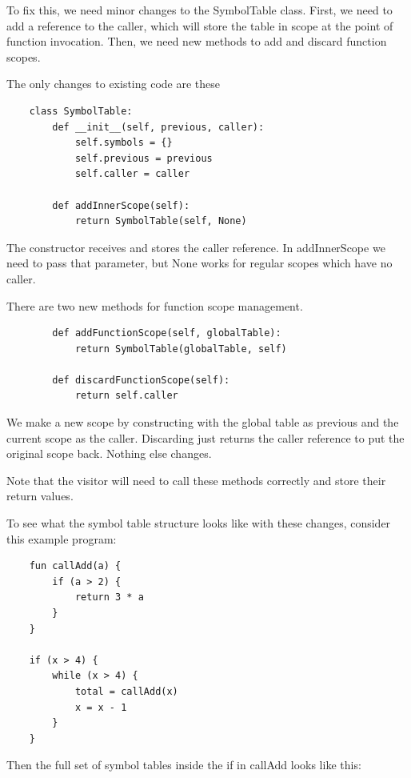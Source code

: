 To fix this, we need minor changes to the SymbolTable class. First,
we need to add a reference to the caller, which will store the
table in scope at the point of function invocation. Then, we
need new methods to add and discard function scopes.

The only changes to existing code are these

{\footnotesize
\begin{verbatim}
    class SymbolTable:
        def __init__(self, previous, caller):
            self.symbols = {}
            self.previous = previous
            self.caller = caller

        def addInnerScope(self):
            return SymbolTable(self, None)
\end{verbatim}
}

The constructor receives and stores the caller reference. In
addInnerScope we need to pass that parameter, but None works for
regular scopes which have no caller.

There are two new methods for function scope management.

{\footnotesize
\begin{verbatim}
        def addFunctionScope(self, globalTable):
            return SymbolTable(globalTable, self)

        def discardFunctionScope(self):
            return self.caller
\end{verbatim}
}

We make a new scope by constructing with the global table
as previous and the current scope as the caller. Discarding just
returns the caller reference to put the original scope back. Nothing
else changes.

Note that the visitor will need to call these methods correctly and
store their return values.

To see what the symbol table structure looks like with these changes,
consider this example program:

{\footnotesize
\begin{verbatim}
    fun callAdd(a) {
        if (a > 2) {
            return 3 * a
        }
    }

    if (x > 4) {
        while (x > 4) {
            total = callAdd(x)
            x = x - 1
        }
    }
\end{verbatim}
}

Then the full set of symbol tables inside the if in callAdd looks like
this:

